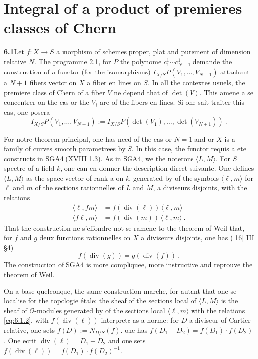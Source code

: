 \documentclass[12pt,a4paper]{article}
\theoremstyle{plain}
\theoremstyle{definition}
\theoremstyle{remark}
\DeclareMathOperator{\divm}{div}
\newcommand{\calO}{\mathcal{O}}
\begin{document}
\section{Integral of a product of premieres classes of Chern}

\noindent\textbf{6.1}\quad Let $f: X \to S$ a morphism of schemes proper, plat and purement of dimension relative $N$. The programme 2.1, for $P$ the polynome $c_1^1 \cdots c_{N+1}^1$ demande the construction of a functor (for the isomorphisms) $I_{X/S} P(V_1, \ldots, V_{N+1})$ attachant a $N+1$ fibers vector on $X$ a fiber en lines on $S$. In all the contextes usuels, the premiere class of Chern of a fiber $V$ ne depend that of $\det(V)$. This amene a se concentrer on the cas or the $V_i$ are of the fibers en lines. Si one sait traiter this cas, one posera
\begin{equation}
\label{eq:6.1.1}
I_{X/S} P(V_1, \ldots, V_{N+1}) := I_{X/S} P(\det(V_1), \ldots, \det(V_{N+1})) \ .
\end{equation}

For notre theorem principal, one has need of the cas or $N = 1$ and or $X$ is a family of curves smooth parametrees by $S$. In this case, the functor requis a ete constructs in SGA4 (XVIII 1.3). As in SGA4, we the noterons $\langle L, M \rangle$. For $S$ spectre of a field $k$, one can en donner the description direct suivante. One defines $\langle L, M \rangle$ as the space vector of rank a on $k$, generated by of the symbols $\langle \ell, m \rangle$ for $\ell$ and $m$ of the sections rationnelles of $L$ and $M$, a diviseurs disjoints, with the relations
\begin{equation}
\label{eq:6.1.2}
\begin{aligned}
\langle \ell, fm \rangle &= f(\divm(\ell)) \, \langle \ell, m \rangle \\
\langle f\ell, m \rangle &= f(\divm(m)) \, \langle \ell, m \rangle \ .
\end{aligned}
\end{equation}
That the construction ne s'effondre not se ramene to the theorem of Weil that, for $f$ and $g$ deux functions rationnelles on $X$ a diviseurs disjoints, one has ([16] III \S 4)
\[
f(\divm(g)) = g(\divm(f)) \ .
\]
The construction of SGA4 is more compliquee, more instructive and reprouve the theorem of Weil.

On a base quelconque, the same construction marche, for autant that one se localise for the topologie étale: the sheaf of the sections local of $\langle L, M \rangle$ is the sheaf of $\calO$-modules generated by of the sections local $\langle \ell, m \rangle$ with the relations \eqref{eq:6.1.2}, with $f(\divm(\ell))$ interprete as a norme: for $D$ a diviseur of Cartier relative, one sets $f(D) := N_{D/S}(f)$. one has $f(D_1 + D_2) = f(D_1) \cdot f(D_2)$. One ecrit $\divm(\ell) = D_1 - D_2$ and one sets $f(\divm(\ell)) = f(D_1) \cdot f(D_2)^{-1}$.
\end{document}
